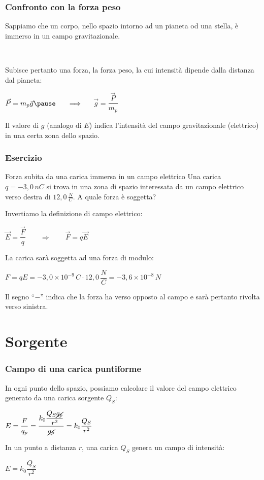 \documentclass[]{beamer}
\theoremstyle{plain}
\begin{document}
\begin{frame}
\frametitle{Confronto con la forza peso}
Sappiamo che un corpo, nello spazio intorno ad un pianeta od una stella, è immerso in un \alert<1>{campo gravitazionale}.\pause

~

Subisce pertanto una forza, la \alert<2-3>{forza peso}, la cui intensità dipende dalla distanza dal pianeta:
\begin{center}
$ \vec{P} = m_p\vec{g} \pause ~~~~~\Longrightarrow~~~~~ $\colorbox{marroncino!30}{$ \vec{g} = \dfrac{\vec{P}}{m_p} $}\pause
\end{center}
Il valore di $ g $ (analogo di $ E $) indica \alert{l'intensità del campo gravitazionale} (elettrico) in una certa zona dello spazio.
\end{frame}







\begin{frame}
\frametitle{Esercizio}

  \begin{exampleblock}{Forza subita da una carica immersa in un campo elettrico}
{\small Una carica $ q = - 3,0 \, nC $ si trova in una zona di spazio interessata da un campo elettrico verso destra di $ 12,0 \, \frac{N}{C} $. A quale forza è soggetta?}
\end{exampleblock}
  \pause
  Invertiamo la definizione di campo elettrico:
  \begin{center}
  $ \vec{E} = \dfrac{\vec{F}}{q} \quad\quad \Longrightarrow \quad\quad \vec{F}=q\vec{E} $
  \end{center}\pause
  La carica sarà soggetta ad una forza di modulo:
  \begin{center}
  $ F = qE = - 3,0 \times 10^{-9} \, C \cdot 12,0 \, \dfrac{N}{C} = - 3,6 \times 10^{-8} \, N $
  \end{center}\pause
Il segno ``$ - $'' indica che la forza ha verso opposto al campo e sarà pertanto rivolta verso sinistra.

\end{frame}

\section{Sorgente}

\begin{frame}
\frametitle{Campo di una carica puntiforme}
In ogni punto dello spazio, possiamo calcolare il valore del campo elettrico generato da una carica sorgente $ Q_S $:
\begin{center}
$ E = \dfrac{F}{q_p} = \dfrac{k_0 \dfrac{Q_S \cancel{q_p}}{r^2}}{\cancel{q_p}} = k_0 \dfrac{Q_S }{r^2} $
\end{center}\pause
In un punto a distanza $ r $, una carica $ Q_S $ genera un campo di intensità:
\begin{center}
\colorbox{marroncino!30}{$ E = k_0 \dfrac{Q_S}{r^2} $}
\end{center}
\end{frame}
\end{document}
